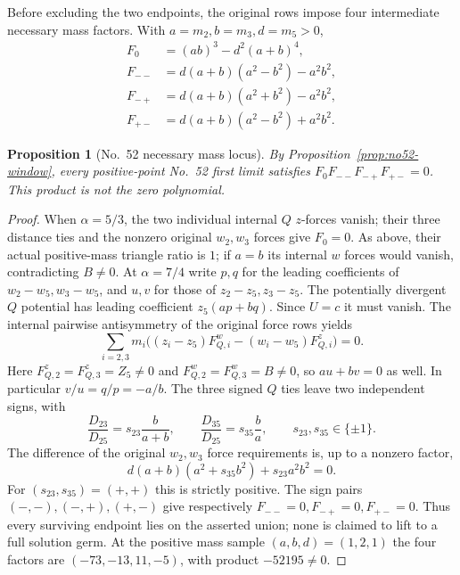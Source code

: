 \documentclass[11pt]{amsart}
\newtheorem{proposition}[theorem]{Proposition}
\theoremstyle{remark}
\begin{document}
Before excluding the two endpoints, the original rows impose four intermediate necessary mass factors. With $a=m_2,b=m_3,d=m_5>0$,
\begin{equation}\label{eq:no52-factors}
\begin{aligned}
F_0&=(ab)^3-d^2(a+b)^4,\\
F_{--}&=d(a+b)(a^2-b^2)-a^2b^2,\\
F_{-+}&=d(a+b)(a^2+b^2)-a^2b^2,\\
F_{+-}&=d(a+b)(a^2-b^2)+a^2b^2.
\end{aligned}
\end{equation}
\begin{proposition}[No.~52 necessary mass locus]\label{prop:no52-locus}
By Proposition~\ref{prop:no52-window}, every positive-point No.~52 first limit satisfies $F_0F_{--}F_{-+}F_{+-}=0$. This product is not the zero polynomial.
\end{proposition}
\begin{proof}
When $\alpha=5/3$, the two individual internal $Q$ $z$-forces vanish; their three distance ties and the nonzero original $w_2,w_3$ forces give $F_0=0$. As above, their actual positive-mass triangle ratio is $1$; if $a=b$ its internal $w$ forces would vanish, contradicting $B\ne0$. At $\alpha=7/4$ write $p,q$ for the leading coefficients of $w_2-w_5,w_3-w_5$, and $u,v$ for those of $z_2-z_5,z_3-z_5$. The potentially divergent $Q$ potential has leading coefficient $z_5(ap+bq)$. Since $U=c$ it must vanish. The internal pairwise antisymmetry of the original force rows yields
\begin{equation}\label{eq:no52-q-torque}
\sum_{i=2,3}m_i\bigl((z_i-z_5)F^w_{Q,i}-(w_i-w_5)F^z_{Q,i}\bigr)=0.
\end{equation}
Here $F^z_{Q,2}=F^z_{Q,3}=Z_5\ne0$ and $F^w_{Q,2}=F^w_{Q,3}=B\ne0$, so $au+bv=0$ as well. In particular $v/u=q/p=-a/b$. The three signed $Q$ ties leave two independent signs, with
\begin{equation}\label{eq:no52-signed-ratios}
\frac{D_{23}}{D_{25}}=s_{23}\frac{b}{a+b},\qquad \frac{D_{35}}{D_{25}}=s_{35}\frac{b}{a},\qquad s_{23},s_{35}\in\{\pm1\}.
\end{equation}
The difference of the original $w_2,w_3$ force requirements is, up to a nonzero factor,
\begin{equation}\label{eq:no52-force-difference}
d(a+b)(a^2+s_{35}b^2)+s_{23}a^2b^2=0.
\end{equation}
For $(s_{23},s_{35})=(+,+)$ this is strictly positive. The sign pairs $(-,-),(-,+),(+,-)$ give respectively $F_{--}=0,F_{-+}=0,F_{+-}=0$. Thus every surviving endpoint lies on the asserted union; none is claimed to lift to a full solution germ. At the positive mass sample $(a,b,d)=(1,2,1)$ the four factors are $(-73,-13,11,-5)$, with product $-52195\ne0$.
\end{proof}
\end{document}
